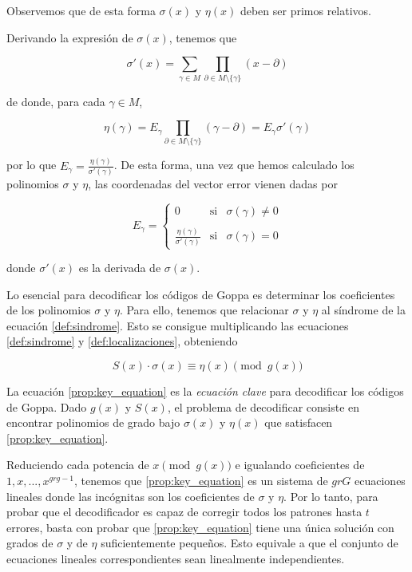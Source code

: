 Observemos que de esta forma $\sigma(x)$ y $\eta(x)$ deben ser primos relativos.

Derivando la expresión de $\sigma(x)$, tenemos que 

\begin{equation}
    \label{def:localizaciones_derivada}
    \sigma'(x) = \sum_{\gamma \in M} \prod_{\partial \in M \setminus \{ \gamma \} } (x - \partial)
\end{equation}


de donde, para cada $\gamma \in M$,

$$\eta (\gamma) = E_\gamma \prod_{\partial \in M \setminus \{ \gamma \} } (\gamma - \partial) = E_\gamma \sigma'(\gamma)$$

por lo que $E_\gamma = \frac{\eta(\gamma)}{\sigma'(\gamma)}$. De esta forma, una vez que hemos calculado los polinomios $\sigma$ y $\eta$, las coordenadas del vector error vienen dadas por 

\[
    E_\gamma = \left\{ \begin{array}{lcc}
    0 &   \text{si}  & \sigma(\gamma) \neq 0 \\
    \\ \frac{\eta(\gamma)}{\sigma'(\gamma)} &  \text{si} & \sigma(\gamma) = 0
    \end{array}
    \right.
\]

donde $\sigma'(x)$ es la derivada de $\sigma(x)$.

Lo esencial para decodificar los códigos de Goppa es determinar los coeficientes de los polinomios $\sigma$ y $\eta$. Para ello, tenemos que relacionar $\sigma$ y $\eta$ al síndrome de la ecuación \ref{def:sindrome}. Esto se consigue multiplicando las ecuaciones \ref{def:sindrome} y \ref{def:localizaciones}, obteniendo

\begin{equation}
    \label{prop:key_equation}
    S(x) \cdot \sigma(x) \equiv \eta(x) \pmod{g(x)}
\end{equation}

La ecuación \ref{prop:key_equation} es la \emph{ecuación clave} para decodificar los códigos de Goppa. Dado $g(x)$ y $S(x)$, el problema de decodificar consiste en encontrar polinomios de grado bajo $\sigma(x)$ y $\eta(x)$ que satisfacen \ref{prop:key_equation}.

Reduciendo cada potencia de $x \pmod{g(x)}$ e igualando coeficientes de $1, x, ..., x^{gr g - 1}$, tenemos que \ref{prop:key_equation} es un sistema de $gr G$ ecuaciones lineales donde las incógnitas son los coeficientes de $\sigma$ y $\eta$. Por lo tanto, para probar que el decodificador es capaz de corregir todos los patrones hasta $t$ errores, basta con probar que \ref{prop:key_equation} tiene una única solución con grados de $\sigma$ y de $\eta$ suficientemente pequeños. Esto equivale a que el conjunto de ecuaciones lineales correspondientes sean linealmente independientes.

